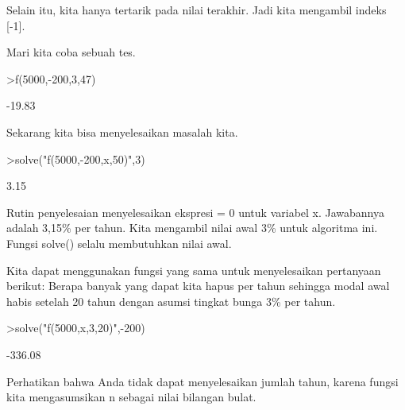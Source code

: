 \documentclass[a4paper,10pt]{article}
\begin{document}
\begin{eulernotebook}
\begin{eulercomment}
Selain itu, kita hanya tertarik pada nilai terakhir. Jadi kita
mengambil indeks [-1].

Mari kita coba sebuah tes.
\end{eulercomment}
\begin{eulerprompt}
>f(5000,-200,3,47)
\end{eulerprompt}
\begin{euleroutput}
       -19.83 
\end{euleroutput}
\begin{eulercomment}
Sekarang kita bisa menyelesaikan masalah kita.
\end{eulercomment}
\begin{eulerprompt}
>solve("f(5000,-200,x,50)",3)
\end{eulerprompt}
\begin{euleroutput}
         3.15 
\end{euleroutput}
\begin{eulercomment}
Rutin penyelesaian menyelesaikan ekspresi = 0 untuk variabel x.
Jawabannya adalah 3,15\% per tahun. Kita mengambil nilai awal 3\% untuk
algoritma ini. Fungsi solve() selalu membutuhkan nilai awal.

Kita dapat menggunakan fungsi yang sama untuk menyelesaikan pertanyaan
berikut: Berapa banyak yang dapat kita hapus per tahun sehingga modal
awal habis setelah 20 tahun dengan asumsi tingkat bunga 3\% per tahun.
\end{eulercomment}
\begin{eulerprompt}
>solve("f(5000,x,3,20)",-200)
\end{eulerprompt}
\begin{euleroutput}
      -336.08 
\end{euleroutput}
\begin{eulercomment}
Perhatikan bahwa Anda tidak dapat menyelesaikan jumlah tahun, karena
fungsi kita mengasumsikan n sebagai nilai bilangan bulat.


\end{eulercomment}
\end{eulernotebook}
\end{document}
